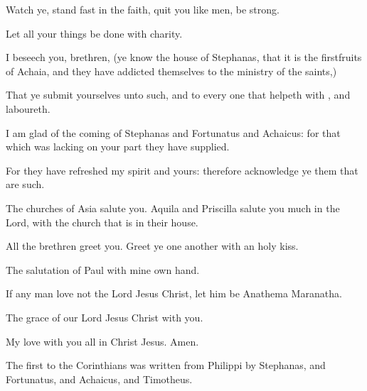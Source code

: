 {Watch
ye, stand
fast
in the
faith, quit you like
men, be
strong.

Let
all
your
things be
done
with
charity.

I
beseech
you,
brethren, (ye
know the
house of
Stephanas,
that it
is the
firstfruits of
Achaia,
and
{} they have
addicted
themselves
to the
ministry of the
saints,)

That
ye submit
yourselves unto
such,
and to every
one
that helpeth
with
{},
and
laboureth.

I am glad
of the
coming of
Stephanas
and
Fortunatus
and
Achaicus: for
that
which was
lacking
on your
part
they have
supplied.

For they have
refreshed
my
spirit
and
yours:
therefore acknowledge
ye them
that are
such.


\par }{\PP {}The
churches of
Asia
salute
you.
Aquila
and
Priscilla
salute
you
much
in the
Lord,
with the
church that is
in
their
house.

All the
brethren
greet
you. Greet
ye one
another
with an
holy
kiss.

The
salutation
of
{}
Paul with mine
own
hand.

If any
man
love
not the
Lord
Jesus
Christ, let him
be
Anathema
Maranatha.

The
grace of our
Lord
Jesus
Christ
{}
with
you.

My
love
{}
with
you
all
in
Christ
Jesus.
Amen.


\par }{\SH The first
{} to the Corinthians was written from Philippi by Stephanas, and Fortunatus, and Achaicus, and Timotheus.
\par }
